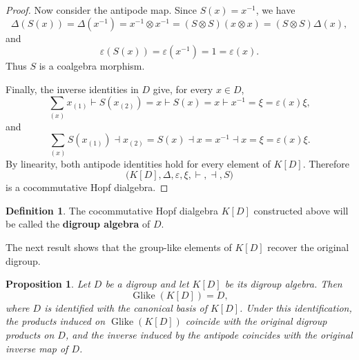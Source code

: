 \documentclass[11pt]{article}
\theoremstyle{plain}
\newtheorem{proposition}[theorem]{Proposition}
\theoremstyle{definition}
\newtheorem{definition}[theorem]{Definition}
\theoremstyle{remark}
\DeclareMathOperator{\Glike}{Glike}
\begin{document}
\begin{proof}
		Now consider the antipode map. Since \(S(x)=x^{-1}\), we have
		\[
		\Delta(S(x))
		=
		\Delta(x^{-1})
		=
		x^{-1}\otimes x^{-1}
		=
		(S\otimes S)(x\otimes x)
		=
		(S\otimes S)\Delta(x),
		\]
		and
		\[
		\varepsilon(S(x))=\varepsilon(x^{-1})=1=\varepsilon(x).
		\]
		Thus \(S\) is a coalgebra morphism.
		
		Finally, the inverse identities in \(D\) give, for every \(x\in D\),
		\[
		\sum_{(x)}x_{(1)}\vdash S(x_{(2)})
		=
		x\vdash S(x)
		=
		x\vdash x^{-1}
		=
		\xi
		=
		\varepsilon(x)\xi,
		\]
		and
		\[
		\sum_{(x)}S(x_{(1)})\dashv x_{(2)}
		=
		S(x)\dashv x
		=
		x^{-1}\dashv x
		=
		\xi
		=
		\varepsilon(x)\xi.
		\]
		By linearity, both antipode identities hold for every element of \(K[D]\).
		Therefore
		\[
		\bigl(K[D],\Delta,\varepsilon,\xi,\vdash,\dashv,S\bigr)
		\]
		is a cocommutative Hopf dialgebra.
	\end{proof}
	
	\begin{definition}\label{def:digroup-algebra}
		The cocommutative Hopf dialgebra \(K[D]\) constructed above will be called
		the \textbf{digroup algebra} of \(D\).
	\end{definition}
	
	The next result shows that the group-like elements of \(K[D]\) recover the
	original digroup.
	
	\begin{proposition}\label{prop:group-likes-recover-digroup}
		Let \(D\) be a digroup and let \(K[D]\) be its digroup algebra. Then
		\[
		\Glike(K[D])=D,
		\]
		where \(D\) is identified with the canonical basis of \(K[D]\). Under this
		identification, the products induced on \(\Glike(K[D])\) coincide with the
		original digroup products on \(D\), and the inverse induced by the antipode
		coincides with the original inverse map of \(D\).
	\end{proposition}
	
\end{document}
